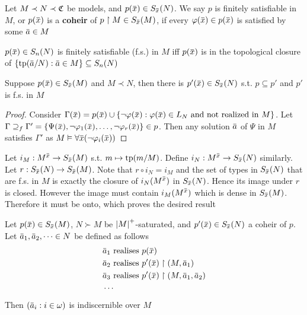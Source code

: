 \documentclass[11pt]{article}
\begin{document}
\begin{definition}[]
Let \(M\prec N\prec\mathfrak{C}\) be models, and \(p(\barx)\in S_{\barx}(N)\). We say \(p\) is finitely satisfiable
in \(M\), or \(p(\barx)\) is a \textbf{coheir} of \(p\uhr M\in S_{\barx}(M)\), if
every \(\varphi(\barx)\in p(\barx)\) is satisfied by some \(\bara\in M\)
\end{definition}

\begin{remark}
\(p(\barx)\in S_n(N)\) is finitely satisfiable (f.s.) in \(M\) iff \(p(\barx)\) is in the
topological closure of \(\{\tp(\bara/N):\bara\in M\}\subseteq S_n(N)\)
\end{remark}

\begin{lemma}[]
\label{P2.8}
Suppose \(p(\barx)\in S_{\barx}(M)\) and \(M\prec N\), then there is \(p'(\barx)\in S_{\barx}(N)\)
s.t. \(p\subseteq p'\) and \(p'\) is f.s. in \(M\)
\end{lemma}

\begin{proof}
Consider \(\Gamma(\barx)=p(\barx)\cup\{\neg\varphi(\barx):\varphi(\barx)\in L_N\text{ and not realized in }M\}\). Let
\(\Gamma\supseteq_f\Gamma'=\{\Psi(\barx),\neg\varphi_1(\barx),\dots,\neg\varphi_r(\barx)\}\in p\). Then any solution \(\bara\) of \(\Psi\) in \(M\)
satisfies \(\Gamma'\) as \(M\vDash\forall\barx(\neg\varphi_i(\barx))\)
\end{proof}

\begin{remark}
Let \(i_M:M^{\barx}\to S_{\barx}(M)\) s.t. \(m\mapsto\operatorname{tp}(m/M)\). Define \(i_N:M^{\barx}\to S_{\barx}(N)\)
similarly. Let \(r:S_{\barx}(N)\to S_{\barx}(M)\). Note that \(r\circ i_N=i_M\) and the set of types
in \(S_{\barx}(N)\) that are f.s. in \(M\) is exactly the closure of \(i_N(M^{\barx})\)
in \(S_{\barx}(N)\). Hence its image under \(r\) is closed. However the image must
contain \(i_M(M^{\barx})\) which is dense in \(S_{\barx}(M)\). Therefore it must be onto, which
proves the desired result

\end{remark}

\begin{proposition}[]
Let \(p(\barx)\in S_{\barx}(M)\), \(N\succ M\) be \(\abs{M}^+\)-saturated,
and \(p'(\barx)\in S_{\barx}(N)\) a coheir of \(p\). Let \(\bara_1,\bara_2,\dots\in N\) be defined as
follows
\begin{align*}
&\bara_1\text{ realises }p(\barx)\\
&\bara_2\text{ realises }p'(\barx)\uhr(M,\bara_1)\\
&\bara_3\text{ realises }p'(\barx)\uhr(M,\bara_1,\bara_2)\\
&\cdots
\end{align*}
Then \((\bara_i:i\in\omega)\) is indiscernible over \(M\)
\end{proposition}
\end{document}
